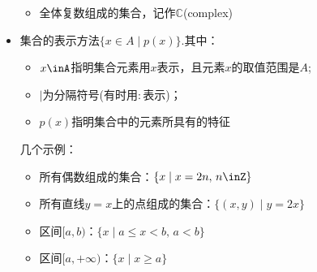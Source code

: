 \begin{itemize}
\begin{itemize}
          \item 全体{\fangsong 复数}组成的集合，记作$\mathbb{C}$(complex)
        \end{itemize}
      \item 集合的表示方法$\{x\in A\mid p(x)\}$.其中：
        \begin{itemize}
          \item $x\inA$指明集合元素用$x$表示，且元素$x$的取值范围是$A$;
          \item $\mid$为分隔符号(有时用$\colon$表示)；
          \item $p(x)$指明集合中的元素所具有的特征
        \end{itemize}
        几个示例：
        \begin{itemize}
          \item 所有偶数组成的集合：$\{x\mid x=2n,\,n\inZ \}$
          \item 所有直线$y=x$上的点组成的集合：$\{(x,y)\mid y=2x\}$
          \item {\fangsong 区间}$[a,b)$：$\{x\mid a\leqslant x<b,\,a<b\}$
          \item {\fangsong 区间}$[a,+\infty)$：$\{x\mid x\geqslant a\}$
        \end{itemize}
    \end{itemize}
